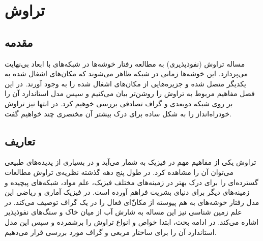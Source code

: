 \chapter{تراوش}
\section{مقدمه}
 مساله تراوش (نفوذپذیری) به مطالعه رفتار  خوشه‌ها  در شبکه‌های با ابعاد بی‌نهایت می‌پردازد. این خوشه‌ها زمانی در شبکه ظاهر می‌شوند که مکان‌های اشغال شده به یکدیگر متصل شده و جزیره‌هایی از مکان‌های اشغال شده را به وجود آورند. در این فصل مفاهیم مربوط به تراوش را روشن‌تر بیان می‌کنیم و سپس مدل استاندارد آن را بر روی شبکه دوبعدی و گراف تصادفی بررسی خوهیم کرد. در انتها نیز تراوش خودراه‌انداز را به شکل ساده برای درک بیشتر آن مختصری چند خواهیم گفت.
\section{تعاریف}
تراوش یکی از مفاهیم مهم در فیزیک به شمار می‌آید و در بسیاری از پدیده‌های طبیعی می‌توان آن را مشاهده کرد. 
در طول پنج دهه گذشته نظریه‌ی تراوش مطالعات گسترده‌ای را برای درک بهتر در زمینه‌های مختلف فیزیک، علم مواد، شبکه‌های پیچیده و زمینه‌های دیگر برای دنیای بشریت  فراهم آورده است.  در فیزیک آماری و ریاضی این مدل رفتار خوشه‌های به هم ‌پیوسته  از مکان‌ّای فعال را در یک گراف توصیف می‌کند. در علم زمین شناسی نیز این مساله به شارش آب از میان خاک و سنگ‌‌های نفوذپذیر اشاره می‌کند. در ادامه بحث، ابتدا خواص و انواع تراوش را برشمرده و سپس این مدل استاندارد آن را برای ساختار مربعی و گراف  مورد بررسی قرار می‌دهیم.

